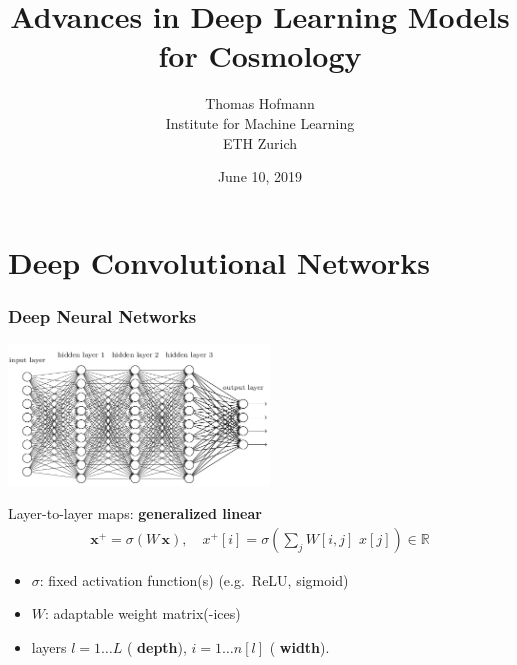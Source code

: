 \documentclass[compress]{beamer}
\author{
   		Thomas Hofmann \\[5mm] 
		Institute for Machine Learning \\ ETH Zurich
	}
\title{
		Advances in Deep Learning Models \\ for Cosmology
	}
\date{
		June 10, 2019
	}
\newcommand{\x}{{\mathbf x}}
\newcommand{\W}{{W}}
\newcommand{\textbblue}[1]{{\bf\color{Blue} #1}}
\newcommand{\textbred}[1]{{\bf\color{Red} #1}}
\renewcommand{\Re}{{\mathbb R}}
\begin{document}
\frame[plain]{\titlepage}

\section{Deep Convolutional Networks}
\frame{\sectionpage}


\begin{frame} \frametitle{Deep Neural Networks}
\begin{center}
\includegraphics[width=0.52\textwidth]{./figures/OH3gI.png}
\end{center}

Layer-to-layer maps: \textbblue{generalized linear} %
\begin{align*}
\x^+ = \sigma \left( \W \, \x \right), \quad x^+[i] = \sigma\left(\sum_{j} \W[i,j]\, \, x[j]\right)\in\Re
\end{align*}
\vspace*{-5mm}
\begin{itemize}
\item $\sigma$: fixed activation function(s) (e.g.~ReLU, sigmoid)
\item $\W$: adaptable weight matrix(-ices)
\item layers $l=1\dots L$ (\textbred{depth}), $i=1\dots n[l]$ (\textbred{width}).\\[2mm]
\end{itemize}
\end{frame}
\end{document}
